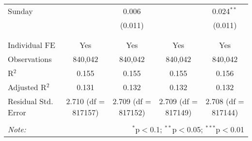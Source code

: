 \documentclass[
]{article}
\begin{document}
\begin{table}[!htbp]
{\begin{tabular}{@{\extracolsep{5pt}}lcccc}
 Sunday &  & 0.006 &  & 0.024$^{**}$ \\ 
  &  & (0.011) &  & (0.011) \\ 
  & & & & \\ 
\hline \\[-1.8ex] 
Individual FE & Yes & Yes & Yes & Yes \\ 
Observations & 840,042 & 840,042 & 840,042 & 840,042 \\ 
R$^{2}$ & 0.155 & 0.155 & 0.155 & 0.156 \\ 
Adjusted R$^{2}$ & 0.131 & 0.132 & 0.132 & 0.132 \\ 
Residual Std. Error & 2.710 (df = 817157) & 2.709 (df = 817152) & 2.709 (df = 817149) & 2.708 (df = 817144) \\ 
\hline 
\hline \\[-1.8ex] 
\textit{Note:}  & \multicolumn{4}{r}{$^{*}$p$<$0.1; $^{**}$p$<$0.05; $^{***}$p$<$0.01} \\ 
\end{tabular}
} 
\end{table}
\end{document}
